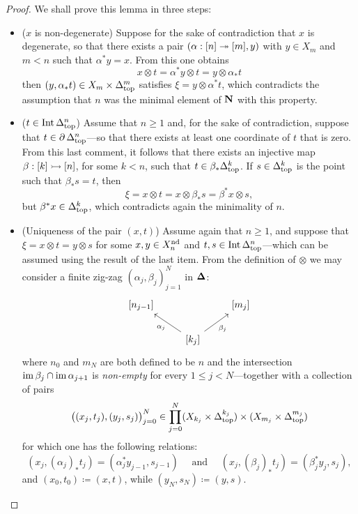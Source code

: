 \begin{proof}
We shall prove this lemma in three steps:
\begin{itemize}\setlength\itemsep{0em}
\item (\(x\) is non-degenerate) Suppose for the sake of contradiction that \(x\)
  is degenerate, so that there exists a pair \((\alpha: [n] \twoheadrightarrow [m], y)\) with
  \(y \in X_m\) and \(m < n\) such that \(\alpha^{*} y = x\). From this one
  obtains
  \[
  x \otimes t = \alpha^{*} y \otimes t = y \otimes \alpha_{*} t
  \]
  then \((y, \alpha_{*} t) \in X_m \times \Delta_{\text{top}}^m\) satisfies
  \(\xi = y \otimes \alpha^{*} t\), which contradicts the assumption that \(n\)
  was the minimal element of \(\mathbf{N}\) with this property.

\item (\(t \in \operatorname{Int} \Delta_{\text{top}}^n\)) Assume that \(n \geq 1\) and, for the sake of
  contradiction, suppose that \(t \in \operatorname{\partial} \Delta_{\text{top}}^n\)---so that there exists
  at least one coordinate of \(t\) that is zero. From this last comment, it
  follows that there exists an injective map \(\beta: [k] \rightarrowtail [n]\), for some
  \(k < n\), such that \(t \in \beta_{*} \Delta_{\text{top}}^k\). If \(s \in \Delta_{\text{top}}^k\) is
  the point such that \(\beta_{*} s = t\), then
  \[
  \xi = x \otimes t = x \otimes \beta_{*} s = \beta^{*} x \otimes s,
  \]
  but \(\beta^{*} x \in \Delta_{\text{top}}^k\), which contradicts again the minimality of
  \(n\).

\item (Uniqueness of the pair \((x, t)\)) Assume again that \(n \geq 1\), and
  suppose that \(\xi = x \otimes t = y \otimes s\) for some
  \(x, y \in X_n^{\operatorname{nd}}\) and \(t, s \in \operatorname{Int} \Delta_{\text{top}}^n\)---which can be
  assumed using the result of the last item. From the definition of \(\otimes\)
  we may consider a finite zig-zag \((\alpha_j, \beta_j)_{j=1}^N\) in \({\mathbf{\Delta}}\):
  \[
  \begin{tikzcd}
  {[n_{j-1}]}
  &&{[m_j]}
  \\
  &{[k_j] \ar[lu, "\alpha_j"]} \ar[ru, "\beta_j"']
  &
  \end{tikzcd}
  \]
  where \(n_0\) and \(m_N\) are both defined to be \(n\) and the intersection
  \(\operatorname{im} \beta_j \cap \operatorname{im} \alpha_{j+1}\) is \emph{non-empty} for every
  \(1 \leq j < N\)---together with a collection of pairs
  \[
  \big((x_j, t_j), (y_j, s_j)\big)_{j=0}^N
  \in \prod_{j=0}^N (X_{k_j} \times \Delta_{\text{top}}^{k_j})
  \times (X_{m_j} \times \Delta_{\text{top}}^{m_j})
  \]
  for which one has the following relations:
  \[
  (x_j, (\alpha_j)_{*} t_j) = (\alpha_j^{*} y_{j-1}, s_{j-1})
  \quad \text{ and } \quad
  (x_j, (\beta_j)_{*} t_j) = (\beta_j^{*} y_j, s_j),
  \]
  and \((x_0, t_0) \coloneq (x, t)\), while \((y_N, s_N) \coloneq (y, s)\).


\end{itemize}
\end{proof}
